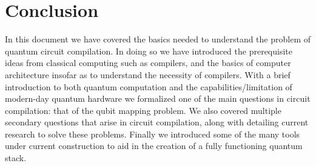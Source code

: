 \chapter{Conclusion}

In this document we have covered the basics needed to understand the problem of quantum circuit compilation.
In doing so we have introduced the prerequisite ideas from classical computing such as compilers, and the basics of computer architecture insofar as to understand the necessity of compilers.
With a brief introduction to both quantum computation and the capabilities/limitation of modern-day quantum hardware we formalized one of the main questions in circuit compilation: that of the qubit mapping problem.
We also covered multiple secondary questions that arise in circuit compilation, along with detailing current research to solve these problems.
Finally we introduced some of the many tools under current construction to aid in the creation of a fully functioning quantum stack.

